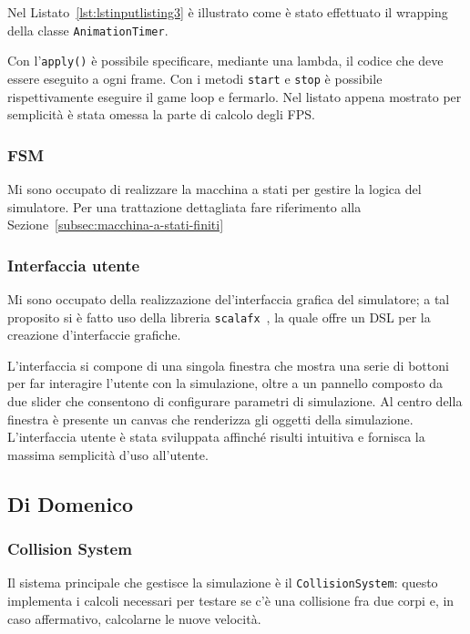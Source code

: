 Nel Listato~\ref{lst:lstinputlisting3} è illustrato come è stato effettuato il wrapping della classe
\texttt{AnimationTimer}.



Con l'\texttt{apply()} è possibile specificare, mediante una lambda, il codice che deve essere eseguito a ogni
frame.
Con i metodi \texttt{start} e \texttt{stop} è possibile rispettivamente eseguire il game loop e fermarlo.
Nel listato appena mostrato per semplicità è stata omessa la parte di calcolo degli FPS\@.

\subsubsection{FSM}
Mi sono occupato di realizzare la macchina a stati per gestire la logica del simulatore.
Per una trattazione dettagliata fare riferimento alla Sezione~\ref{subsec:macchina-a-stati-finiti}

\subsubsection{Interfaccia utente}
Mi sono occupato della realizzazione del'interfaccia grafica del simulatore;
a tal proposito si è fatto uso della libreria \texttt{scalafx}~\cite{scalafx}, la quale offre un DSL per la creazione
d'interfaccie grafiche.

L'interfaccia si compone di una singola finestra che mostra una serie di bottoni per far interagire l'utente con la
simulazione, oltre a un pannello composto da due slider che consentono di configurare parametri di simulazione.
Al centro della finestra è presente un canvas che renderizza gli oggetti della simulazione.
L'interfaccia utente è stata sviluppata affinché risulti intuitiva e fornisca la massima semplicità d'uso all'utente.

\subsection{Di Domenico}\label{subsec:demo-di-domenico}

\subsubsection{Collision System}\label{subsec:container}
Il sistema principale che gestisce la simulazione è il \texttt{CollisionSystem}: questo implementa i calcoli necessari
per testare se c'è una collisione fra due corpi e, in caso affermativo, calcolarne le nuove velocità.

